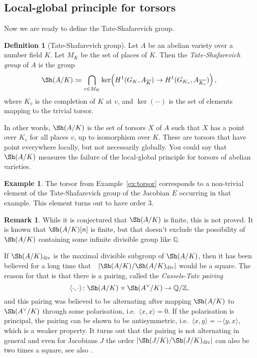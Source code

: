 \documentclass[12pt]{article}
\theoremstyle{definition}
\newtheorem{definition}[theorem]{Definition}
\newtheorem{remark}[theorem]{Remark}
\newtheorem{example}[theorem]{Example}
\numberwithin{equation}{subsection}
\newcommand{\Q}{\ensuremath{\mathbb{Q}}}
\newcommand{\Z}{\ensuremath{\mathbb{Z}}}
\begin{document}
\subsection{Local-global principle for torsors}

Now we are ready to define the Tate-Shafarevich group.

\begin{definition}[Tate-Shafarevich group]
Let $A$ be an abelian variety over a number field $K$.
Let $M_K$ be the set of places of $K$.
Then the {\em Tate-Shafarevich group} of $A$ is the group
$$\Sh(A/K) \coloneqq \bigcap_{v \in M_K} \ker\!\left(H^1(G_K, A_{\overline{K}}) \to H^1(G_{K_v}, A_{\overline{K_v}})\right),$$
where $K_v$ is the completion of $K$ at $v$, and $\ker(\cdots)$ is the set of elements mapping to the trivial torsor.
\end{definition}

In other words, $\Sh(A/K)$ is the set of torsors $X$ of $A$ such that $X$ has a point over $K_v$ for all places $v$, up to isomorphism over $K$.
These are torsors that have point everywhere locally, but not necessarily globally.
You could say that $\Sh(A/K)$ measures the failure of the local-global principle for torsors of abelian varieties.

\begin{example}
The torsor from Example~\ref{ex:torsor} corresponds to a non-trivial element of the Tate-Shafarevich group of the Jacobian $E$ occurring in that example.
This element turns out to have order 3.
\end{example}

\begin{remark}
While it is conjectured that $\Sh(A/K)$ is finite, this is not proved.
It is known that $\Sh(A/K)[n]$ is finite, but that doesn't exclude the possibility of $\Sh(A/K)$ containing some infinite divisible group like $\Q$.

If $\Sh(A/K)_\textrm{div}$ is the maximal divisible subgroup of $\Sh(A/K)$, then it has been believed for a long time that~\ $|\Sh(A/K)/\Sh(A/K)_\textrm{div}|$ would be a square. The reason for that is that there is a pairing, called the {\em Cassels-Tate pairing}
$$\langle \cdot, \cdot \rangle \colon \Sh(A/K) \times \Sh(A^\vee/K) \to \Q/\Z,$$
and this pairing was believed to be alternating after mapping $\Sh(A/K)$ to $\Sh(A^\vee/K)$ through some polarisation, i.e.\ $\langle x,x \rangle = 0$.
If the polarisation is principal, the pairing can be shown to be antisymmetric, i.e.\ $\langle x,y\rangle = -\langle y,x\rangle$, which is a weaker property.
It turns out that the pairing is not alternating in general and even for Jacobians $J$ the order $|\Sh(J/K)/\Sh(J/K)_\textrm{div}|$ can also be two times a square, see also \cite{PoonenStoll}.


\end{remark}
\end{document}
